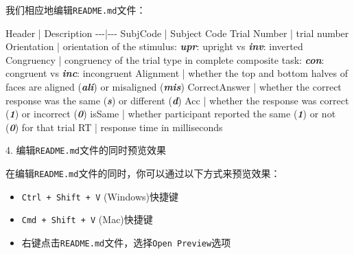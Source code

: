 \documentclass[]{ctexbook}
\newenvironment{Shaded}{\begin{snugshade}}{\end{snugshade}}
\newcommand{\InformationTok}[1]{\textcolor[rgb]{0.56,0.35,0.01}{\textbf{\textit{#1}}}}
\newcommand{\NormalTok}[1]{#1}
\providecommand{\tightlist}{%
  \setlength{\itemsep}{0pt}\setlength{\parskip}{0pt}}
\theoremstyle{definition}
\theoremstyle{definition}
\theoremstyle{definition}
\theoremstyle{definition}
\theoremstyle{remark}
\begin{document}
我们相应地编辑\texttt{README.md}文件：

\begin{Shaded}
\begin{Highlighting}[]

\NormalTok{Header | Description}
\NormalTok{{-}{-}{-}|{-}{-}{-}}
\NormalTok{SubjCode | Subject Code}
\NormalTok{Trial Number | trial number}
\NormalTok{Orientation | orientation of the stimulus: }\InformationTok{\textasciigrave{}upr\textasciigrave{}}\NormalTok{: upright vs }\InformationTok{\textasciigrave{}inv\textasciigrave{}}\NormalTok{: inverted}
\NormalTok{Congruency | congruency of the trial type in complete composite task: }\InformationTok{\textasciigrave{}con\textasciigrave{}}\NormalTok{: congruent vs }\InformationTok{\textasciigrave{}inc\textasciigrave{}}\NormalTok{: incongruent}
\NormalTok{Alignment | whether the top and bottom halves of faces are aligned (}\InformationTok{\textasciigrave{}ali\textasciigrave{}}\NormalTok{) or misaligned (}\InformationTok{\textasciigrave{}mis\textasciigrave{}}\NormalTok{)}
\NormalTok{CorrectAnswer | whether the correct response was the same (}\InformationTok{\textasciigrave{}s\textasciigrave{}}\NormalTok{) or different (}\InformationTok{\textasciigrave{}d\textasciigrave{}}\NormalTok{)}
\NormalTok{Acc | whether the response was correct (}\InformationTok{\textasciigrave{}1\textasciigrave{}}\NormalTok{) or incorrect (}\InformationTok{\textasciigrave{}0\textasciigrave{}}\NormalTok{)}
\NormalTok{isSame | whether participant reported the same (}\InformationTok{\textasciigrave{}1\textasciigrave{}}\NormalTok{) or not (}\InformationTok{\textasciigrave{}0\textasciigrave{}}\NormalTok{) for that trial}
\NormalTok{RT | response time in milliseconds}
\end{Highlighting}
\end{Shaded}

4. 编辑\texttt{README.md}文件的同时预览效果

在编辑\texttt{README.md}文件的同时，你可以通过以下方式来预览效果：

\begin{itemize}
\tightlist
\item
  \texttt{Ctrl\ +\ Shift\ +\ V} (Windows)快捷键
\item
  \texttt{Cmd\ +\ Shift\ +\ V} (Mac)快捷键
\item
  右键点击\texttt{README.md}文件，选择\texttt{Open\ Preview}选项
\end{itemize}
\end{document}
